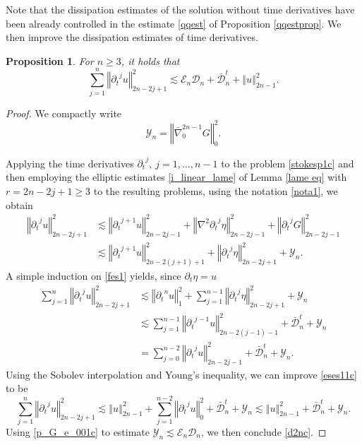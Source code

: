 \documentclass[a4paper,reqno,11pt]{amsart}
\numberwithin{equation}{section}
\providecommand{\norm}[1]{\left\Vert#1\right\Vert}
\providecommand{\sd}[1]{\mathcal{D}_{#1}}
\providecommand{\se}[1]{\mathcal{E}_{#1}}
\providecommand{\ns}[1]{\norm{#1}^2}
\providecommand{\norm}[1]{\left\Vert#1\right\Vert}
\newtheorem{prop}[lem]{Proposition}
\begin{document}
Note that the dissipation estimates of the solution without time derivatives have been already controlled in the estimate \eqref{qqest} of Proposition \ref{qqestprop}. We then improve the dissipation estimates of time derivatives.
\begin{prop}\label{p_upper_evolution  N'c}
For $n\ge 3$, it holds that
\begin{equation}\label{d2nc}
\sum_{j=1}^{n}\norm{ {\partial_t}^j u  }_{2n-2j+1}^2{\lesssim}  { \se{n}  }\sd{n}+\bar{\mathcal{D}}_{n}^t+\norm{ u   }_{2n-1 }^2 .
\end{equation}
\end{prop}
\begin{proof}
We compactly write
\begin{equation}\label{nota1}
 \mathcal{Y}_n =  \ns{ \bar{\nabla}_0^{2n-1} G}_{0}.
\end{equation}

Applying the time derivatives ${\partial_t}^{j},\ j=1,\dots,n-1$ to the problem \eqref{stokesp1c} and then employing the elliptic estimates \eqref{i_linear_lame} of Lemma \ref{lame eq} with $r=2n-2j+1\ge 3$ to the resulting problems, using the notation \eqref{nota1}, we obtain
\begin{equation}
\begin{split}\label{fes1}
\norm{{\partial_t}^j  u  }_{2n-2j+1}^2
 &{\lesssim}
\norm{ {\partial_t}^{j+1} u   }_{2n-2j-1 }^2+\norm{ \nabla^2 {\partial_t}^{j }\eta}_{2n-2j-1 }^2+ \norm{ {\partial_t}^j G   }_{2n-2j-1}^2
\\&{\lesssim}   \norm{{\partial_t}^{j+1} u   }_{2n-2(j+1)+1 }^2 + \norm{{\partial_t}^{j }\eta  }_{2n-2 j +1 }^2 +  \mathcal{Y}_n.
\end{split}
\end{equation}
A simple induction on \eqref{fes1} yields, since ${\partial_t} \eta=u$
\begin{equation}\label{eses11c}
\begin{split}
  \sum_{j=1}^{n}\norm{ {\partial_t}^j u  }_{2n-2j+1}^2
 & {\lesssim} \ns{{\partial_t}^{n} u}_{1}+ \sum_{j=1}^{n-1}\norm{{\partial_t}^{j }\eta  }_{2n-2 j +1 }^2   +  \mathcal{Y}_n
\\&   {\lesssim}   \sum_{j=1}^{n-1}\norm{{\partial_t}^{j-1} u   }_{2n-2(j-1)-1 }^2 + \bar{\mathcal{D}}_{n}^t+\mathcal{Y}_n
\\&  = \sum_{j=0}^{n-2}\norm{{\partial_t}^{j } u   }_{2n-2j-1 }^2   + \bar{\mathcal{D}}_{n}^t+\mathcal{Y}_n.
\end{split}
\end{equation}
Using the Sobolev interpolation and Young's inequality, we can improve \eqref{eses11c} to be
\begin{equation}
  \sum_{j=1}^{n}\norm{ {\partial_t}^j u  }_{2n-2j+1}^2
  {\lesssim}   \norm{  u   }_{2n-1}^2   +  \sum_{j=1}^{n-2}\norm{{\partial_t}^{j } u   }_{0}^2   + \bar{\mathcal{D}}_{n}^t+\mathcal{Y}_n{\lesssim} \norm{  u   }_{2n-1}^2   + \bar{\mathcal{D}}_{n}^t+\mathcal{Y}_n.
\end{equation}
Using \eqref{p_G_e_001c} to estimate $\mathcal{Y}_n{\lesssim} { \se{n}  }\sd{n}$, we then conclude \eqref{d2nc}.
\end{proof}
\end{document}
